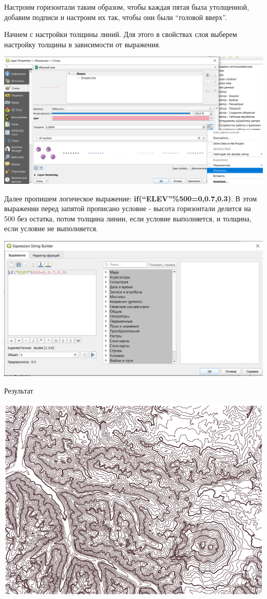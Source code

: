 \documentclass[
]{book}
\begin{document}
Настроим горизонтали таким образом, чтобы каждая пятая была утолщенной, добавим подписи и настроим их так, чтобы они были ``головой вверх''.

Начнем с настройки толщины линий. Для этого в свойствах слоя выберем настройку толщины в зависимости от выражения.

\includegraphics{figures/85.png}

Далее пропишем логическое выражение: \textbf{if(``ELEV''\%500=0,0.7,0.3)}. В этом выражении перед запятой прописано условие - высота горизонтали делится на 500 без остатка, потом толщина линии, если условие выполняется, и толщина, если условие не выполняется.

\includegraphics{figures/86.PNG}

Результат

\includegraphics{figures/87.PNG}
\end{document}
